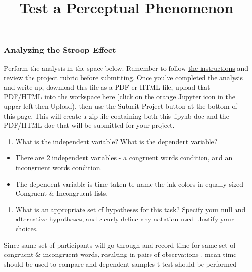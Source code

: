 \documentclass[11pt]{article}
\title{Test a Perceptual Phenomenon}
\providecommand{\tightlist}{%
      \setlength{\itemsep}{0pt}\setlength{\parskip}{0pt}}
\begin{document}
    
    
    \maketitle
    
    

    
    \subsubsection{Analyzing the Stroop
Effect}\label{analyzing-the-stroop-effect}

Perform the analysis in the space below. Remember to follow
\href{https://docs.google.com/document/d/1-OkpZLjG_kX9J6LIQ5IltsqMzVWjh36QpnP2RYpVdPU/pub?embedded=True}{the
instructions} and review the
\href{https://review.udacity.com/\#!/rubrics/71/view}{project rubric}
before submitting. Once you've completed the analysis and write-up,
download this file as a PDF or HTML file, upload that PDF/HTML into the
workspace here (click on the orange Jupyter icon in the upper left then
Upload), then use the Submit Project button at the bottom of this page.
This will create a zip file containing both this .ipynb doc and the
PDF/HTML doc that will be submitted for your project.

\begin{enumerate}
\def\labelenumi{(\arabic{enumi})}
\tightlist
\item
  What is the independent variable? What is the dependent variable?
\end{enumerate}

    \begin{itemize}
\item
  There are 2 independent variables - a congruent words condition, and
  an incongruent words condition.
\item
  The dependent variable is time taken to name the ink colors in
  equally-sized Congruent \& Incongruent lists.
\end{itemize}

    \begin{enumerate}
\def\labelenumi{(\arabic{enumi})}
\setcounter{enumi}{1}
\tightlist
\item
  What is an appropriate set of hypotheses for this task? Specify your
  null and alternative hypotheses, and clearly define any notation used.
  Justify your choices.
\end{enumerate}

    Since same set of participants will go through and record time for same
set of congruent \& incongruent words, resulting in pairs of
observations , mean time should be used to compare and dependent samples
t-test should be performed
\end{document}
